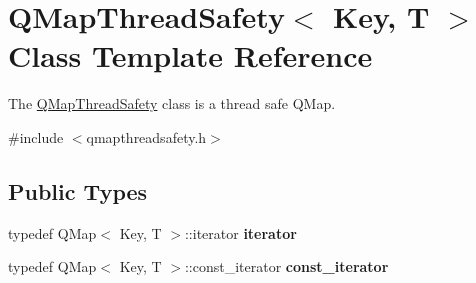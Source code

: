 \hypertarget{class_q_map_thread_safety}{}\section{Q\+Map\+Thread\+Safety$<$ Key, T $>$ Class Template Reference}
\label{class_q_map_thread_safety}


The \mbox{\hyperlink{class_q_map_thread_safety}{Q\+Map\+Thread\+Safety}} class is a thread safe Q\+Map.  




{\ttfamily \#include $<$qmapthreadsafety.\+h$>$}

\subsection*{Public Types}
\begin{DoxyCompactItemize}
\item 
\mbox{\label{class_q_map_thread_safety_a454c8af3f68e6d61aecaf1b918aa525b}} 
typedef Q\+Map$<$ Key, T $>$\+::iterator {\bfseries iterator}
\item 
\mbox{\label{class_q_map_thread_safety_aa58d8479729f72b33e305a4d0ca957bd}} 
typedef Q\+Map$<$ Key, T $>$\+::const\+\_\+iterator {\bfseries const\+\_\+iterator}
\end{DoxyCompactItemize}
